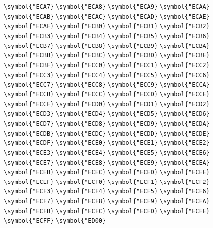 \documentclass{ctexbook}
\begin{document}
{\verb|\symbol{"ECA7}|  \verb|\symbol{"ECA8}|  \verb|\symbol{"ECA9}|  \verb|\symbol{"ECAA}|  \verb|\symbol{"ECAB}|  \verb|\symbol{"ECAC}|  \verb|\symbol{"ECAD}|  \verb|\symbol{"ECAE}|  \verb|\symbol{"ECAF}|  \verb|\symbol{"ECB0}|  \verb|\symbol{"ECB1}|  \verb|\symbol{"ECB2}|  \verb|\symbol{"ECB3}|  \verb|\symbol{"ECB4}|  \verb|\symbol{"ECB5}|  \verb|\symbol{"ECB6}|  \verb|\symbol{"ECB7}|  \verb|\symbol{"ECB8}|  \verb|\symbol{"ECB9}|  \verb|\symbol{"ECBA}|  \verb|\symbol{"ECBB}|  \verb|\symbol{"ECBC}|  \verb|\symbol{"ECBD}|  \verb|\symbol{"ECBE}|  \verb|\symbol{"ECBF}|  \verb|\symbol{"ECC0}|  \verb|\symbol{"ECC1}|  \verb|\symbol{"ECC2}|  \verb|\symbol{"ECC3}|  \verb|\symbol{"ECC4}|  \verb|\symbol{"ECC5}|  \verb|\symbol{"ECC6}|  \verb|\symbol{"ECC7}|  \verb|\symbol{"ECC8}|  \verb|\symbol{"ECC9}|  \verb|\symbol{"ECCA}|  \verb|\symbol{"ECCB}|  \verb|\symbol{"ECCC}|  \verb|\symbol{"ECCD}|  \verb|\symbol{"ECCE}|  \verb|\symbol{"ECCF}|  \verb|\symbol{"ECD0}|  \verb|\symbol{"ECD1}|  \verb|\symbol{"ECD2}|  \verb|\symbol{"ECD3}|  \verb|\symbol{"ECD4}|  \verb|\symbol{"ECD5}|  \verb|\symbol{"ECD6}|  \verb|\symbol{"ECD7}|  \verb|\symbol{"ECD8}|  \verb|\symbol{"ECD9}|  \verb|\symbol{"ECDA}|  \verb|\symbol{"ECDB}|  \verb|\symbol{"ECDC}|  \verb|\symbol{"ECDD}|  \verb|\symbol{"ECDE}|  \verb|\symbol{"ECDF}|  \verb|\symbol{"ECE0}|  \verb|\symbol{"ECE1}|  \verb|\symbol{"ECE2}|  \verb|\symbol{"ECE3}|  \verb|\symbol{"ECE4}|  \verb|\symbol{"ECE5}|  \verb|\symbol{"ECE6}|  \verb|\symbol{"ECE7}|  \verb|\symbol{"ECE8}|  \verb|\symbol{"ECE9}|  \verb|\symbol{"ECEA}|  \verb|\symbol{"ECEB}|  \verb|\symbol{"ECEC}|  \verb|\symbol{"ECED}|  \verb|\symbol{"ECEE}|  \verb|\symbol{"ECEF}|  \verb|\symbol{"ECF0}|  \verb|\symbol{"ECF1}|  \verb|\symbol{"ECF2}|  \verb|\symbol{"ECF3}|  \verb|\symbol{"ECF4}|  \verb|\symbol{"ECF5}|  \verb|\symbol{"ECF6}|  \verb|\symbol{"ECF7}|  \verb|\symbol{"ECF8}|  \verb|\symbol{"ECF9}|  \verb|\symbol{"ECFA}|  \verb|\symbol{"ECFB}|  \verb|\symbol{"ECFC}|  \verb|\symbol{"ECFD}|  \verb|\symbol{"ECFE}|  \verb|\symbol{"ECFF}|  \verb|\symbol{"ED00}|  }
\end{document}
